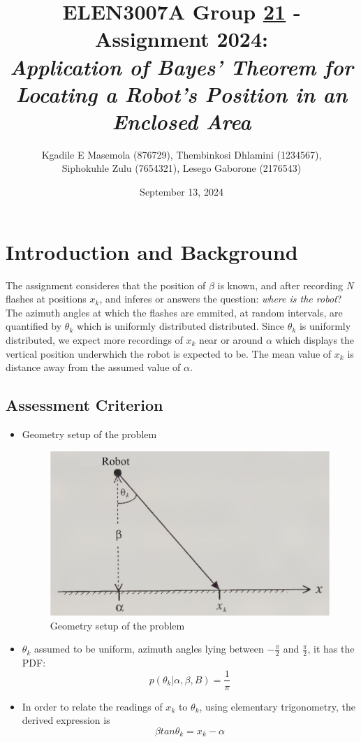 \documentclass[a4paper,11pt]{article}
\title{ELEN3007A Group \underline{21} - Assignment 2024: \\ 
\large \emph{Application of Bayes’ Theorem for Locating a Robot’s
Position in an Enclosed Area}}
\author{Kgadile E Masemola (876729),  Thembinkosi Dhlamini (1234567),
 \\Siphokuhle Zulu (7654321), Lesego Gaborone (2176543)}
\date{September 13, 2024}
\begin{document}
\maketitle

\section*{Introduction and Background}
The assignment consideres that the position of $\beta$ is known, and after recording \emph{N} flashes at positions $x_k$, and inferes or answers the question: \emph{where is the robot}?\\
The azimuth angles at which the flashes are emmited, at random intervals, are quantified by $\theta_k$ which is uniformly distributed distributed. Since $\theta_k$ is uniformly distributed, we expect more recordings of $x_k$ near or around $\alpha$ which displays the vertical position underwhich the robot is expected to be. The mean value of $x_k$ is distance away from the assumed value of $\alpha$.

\subsection*{Assessment Criterion}
\begin{itemize}
	\item Geometry setup of the problem
		\begin{figure}[h]
        		\centering
        		\includegraphics[scale=0.5]{elen3007assignfig.png} 
        		\caption{Geometry setup of the problem}
        \end{figure}
	\item $\theta_k$ assumed to be uniform, azimuth angles lying between $-\frac{\pi}{2}$ and $\frac{\pi}{2}$, it has the PDF:
		\begin{equation}
			p(\theta_k | \alpha, \beta, B) = \frac{1}{\pi}
		\end{equation}
	\item In order to relate the readings of $x_k$ to $\theta_k$, using elementary trigonometry, the derived expression is
		\begin{equation}
			\beta tan \theta_k = x_k - \alpha
		\end{equation}
\end{itemize}
\end{document}
